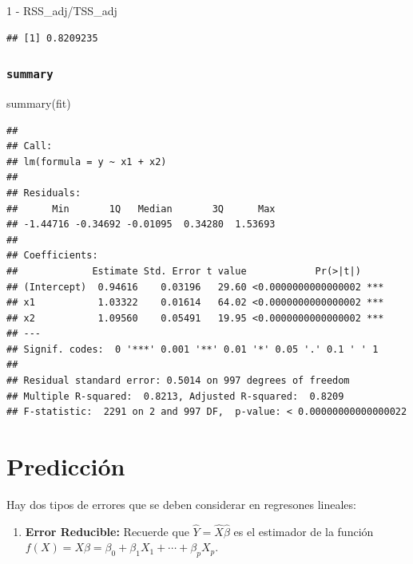 \documentclass[
  12pt,
]{book}
\newenvironment{Shaded}{\begin{snugshade}}{\end{snugshade}}
\newcommand{\DecValTok}[1]{\textcolor[rgb]{0.00,0.00,0.81}{#1}}
\newcommand{\FunctionTok}[1]{\textcolor[rgb]{0.00,0.00,0.00}{#1}}
\newcommand{\NormalTok}[1]{#1}
\newcommand{\SpecialCharTok}[1]{\textcolor[rgb]{0.00,0.00,0.00}{#1}}
\providecommand{\tightlist}{%
  \setlength{\itemsep}{0pt}\setlength{\parskip}{0pt}}
\theoremstyle{definition}
\theoremstyle{definition}
\theoremstyle{definition}
\theoremstyle{remark}
\begin{document}
\begin{Shaded}
\begin{Highlighting}[]
\DecValTok{1} \SpecialCharTok{{-}}\NormalTok{ RSS\_adj}\SpecialCharTok{/}\NormalTok{TSS\_adj}
\end{Highlighting}
\end{Shaded}

\begin{verbatim}
## [1] 0.8209235
\end{verbatim}

\hypertarget{summary}{%
\subsubsection{\texorpdfstring{\texttt{summary}}{summary}}\label{summary}}

\begin{Shaded}
\begin{Highlighting}[]
\FunctionTok{summary}\NormalTok{(fit)}
\end{Highlighting}
\end{Shaded}

\begin{verbatim}
## 
## Call:
## lm(formula = y ~ x1 + x2)
## 
## Residuals:
##      Min       1Q   Median       3Q      Max 
## -1.44716 -0.34692 -0.01095  0.34280  1.53693 
## 
## Coefficients:
##             Estimate Std. Error t value            Pr(>|t|)    
## (Intercept)  0.94616    0.03196   29.60 <0.0000000000000002 ***
## x1           1.03322    0.01614   64.02 <0.0000000000000002 ***
## x2           1.09560    0.05491   19.95 <0.0000000000000002 ***
## ---
## Signif. codes:  0 '***' 0.001 '**' 0.01 '*' 0.05 '.' 0.1 ' ' 1
## 
## Residual standard error: 0.5014 on 997 degrees of freedom
## Multiple R-squared:  0.8213, Adjusted R-squared:  0.8209 
## F-statistic:  2291 on 2 and 997 DF,  p-value: < 0.00000000000000022
\end{verbatim}

\hypertarget{predicciuxf3n}{%
\section{Predicción}\label{predicciuxf3n}}

Hay dos tipos de errores que se deben considerar en regresones lineales:

\begin{enumerate}
\def\labelenumi{\arabic{enumi}.}
\tightlist
\item
  \textbf{Error Reducible:} Recuerde que \(\hat{Y} = \hat{X}\hat{\beta}\) es el estimador de la función \(f(X)=X\beta = \beta_{0} + \beta_{1}X_{1}+\cdots+\beta_{p}X_{p}\).
\end{enumerate}
\end{document}

